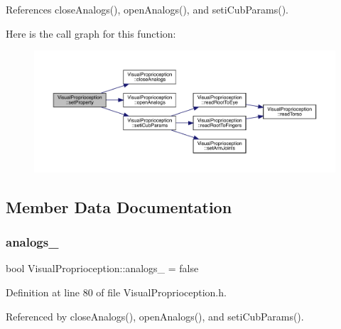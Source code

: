 References close\+Analogs(), open\+Analogs(), and seti\+Cub\+Params().

Here is the call graph for this function\+:
\nopagebreak
\begin{figure}[H]
\begin{center}
\leavevmode
\includegraphics[width=350pt]{classVisualProprioception_a59835a3e089f463855de8e228fc4fd91_cgraph}
\end{center}
\end{figure}


\subsection{Member Data Documentation}
\mbox{\label{classVisualProprioception_a86284ecba20206e3ecb3125fc90f3ce8}} 
\subsubsection{\texorpdfstring{analogs\+\_\+}{analogs\_}}
{\footnotesize\ttfamily bool Visual\+Proprioception\+::analogs\+\_\+ = false\hspace{0.3cm}{\ttfamily [protected]}}



Definition at line 80 of file Visual\+Proprioception.\+h.



Referenced by close\+Analogs(), open\+Analogs(), and seti\+Cub\+Params().

\mbox{\label{classVisualProprioception_ae7488d918a9c1893192622cd371d0277}} 
